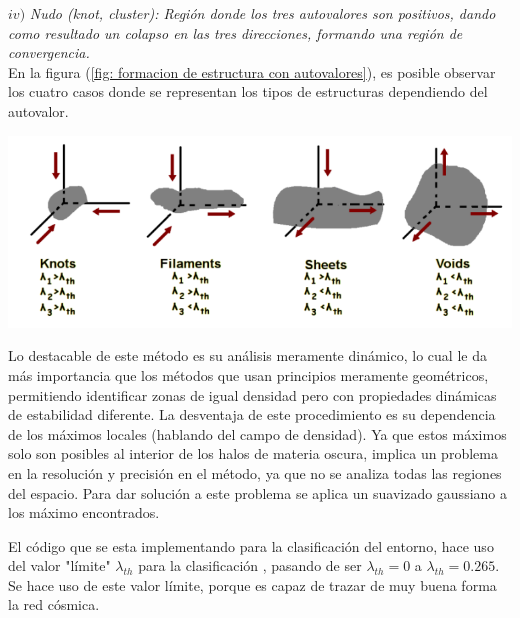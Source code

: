 $iv)$ {\it{Nudo (knot, cluster)}: Región donde los tres autovalores son positivos, dando como resultado un colapso en las tres direcciones, formando una región de convergencia.}\\

En la figura (\ref{fig: formacion de estructura con autovalores}), es posible observar los cuatro casos donde se representan los tipos de estructuras dependiendo del autovalor.
%
\begin{center}
\includegraphics[scale=.39]{./figures/5_Algoritmo_Modelacion/formacion_estructuras.png}
\label{fig: formacion de estructura con autovalores}
\end{center}
%
Lo destacable de este método es su análisis meramente dinámico, lo cual le da más importancia que los métodos que usan principios meramente geométricos, permitiendo identificar zonas de igual densidad pero con propiedades dinámicas de estabilidad diferente. La desventaja de este procedimiento es su dependencia de los máximos locales (hablando del campo de densidad). 
Ya que estos máximos solo son posibles al interior de los halos de materia oscura, implica un problema en la resolución y precisión en el método, ya que no se analiza todas las regiones del espacio. Para
dar solución a este problema se aplica un suavizado gaussiano a los máximo encontrados.


El código que se esta implementando para la clasificación del entorno, hace uso del valor "límite" $\lambda_{th}$ para la clasificación \cite{bustamante2015}, pasando de ser $\lambda_{th}=0$ a $\lambda_{th}=0.265$. Se hace uso de este valor límite, porque es capaz de trazar de muy buena forma la red cósmica. 

